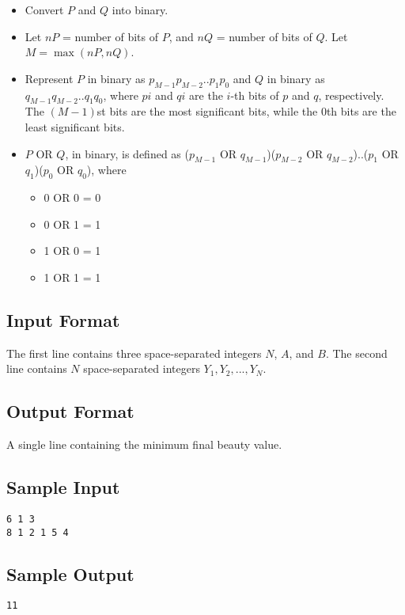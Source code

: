 \documentclass{report}
\begin{document}
\begin{itemize} \itemsep1pt \parskip0pt
\item Convert $P$ and $Q$ into binary.
\item Let $nP$ = number of bits of $P$, and $nQ$ = number of bits of $Q$. Let $M = \max(nP, nQ)$.
\item Represent $P$ in binary as $p_{M-1}p_{M-2} .. p_1p_0$ and $Q$ in binary as $q_{M-1}q_{M-2} .. q_1q_0$, where $pi$ and $qi$ are the $i$-th bits of $p$ and $q$, respectively. The $(M-1)$st bits are the most significant bits, while the $0$th bits are the least significant bits.
\item $P$ OR $Q$, in binary, is defined as ($p_{M-1}$ OR $q_{M-1}$)($p_{M-2}$ OR $q_{M-2}$)..($p_1$ OR $q_1$)($p_0$ OR $q_0$), where
\begin{itemize} \itemsep1pt \parskip0pt
\item 0 OR 0 = 0
\item 0 OR 1 = 1
\item 1 OR 0 = 1
\item 1 OR 1 = 1
\end{itemize}
\end{itemize}

\subsection*{Input Format}
The first line contains three space-separated integers $N$, $A$, and $B$. The second line contains $N$ space-separated integers $Y_1, Y_2, ..., Y_N$.

\subsection*{Output Format}
A single line containing the minimum final beauty value.

\subsection*{Sample Input}
\begin{verbatim}
6 1 3
8 1 2 1 5 4
\end{verbatim}

\subsection*{Sample Output}
\begin{verbatim}
11
\end{verbatim}
\end{document}
